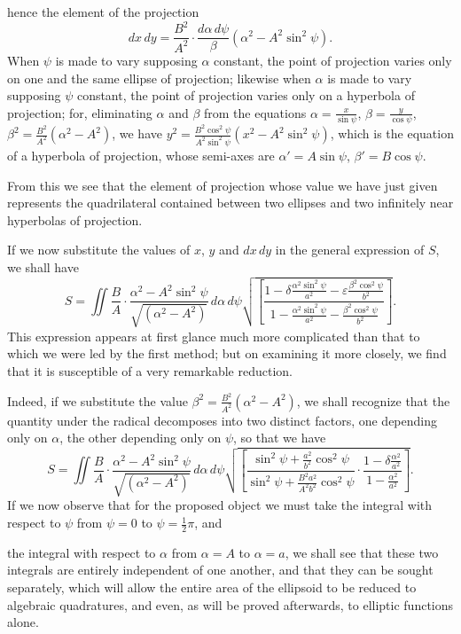 \documentclass{article}
\begin{document}
hence the element of the projection
\[ dx\,dy=\frac{B^{2}}{A^{2}}\cdot\frac{d\alpha\,d\psi}{\beta}(\alpha^{2}-A^{2}\sin^{2}\psi). \]
When $\psi$ is made to vary supposing $\alpha$ constant, the point of projection varies only on one and the same ellipse of projection; likewise when $\alpha$ is made to vary supposing $\psi$ constant, the point of projection varies only on a hyperbola of projection; for, eliminating $\alpha$ and $\beta$ from the equations $\alpha=\frac{x}{\sin\psi}$, $\beta=\frac{y}{\cos\psi}$, $\beta^{2}=\frac{B^{2}}{A^{2}}(\alpha^{2}-A^{2})$, we have $y^{2}=\frac{B^{2}\cos^{2}\psi}{A^{2}\sin^{2}\psi}(x^{2}-A^{2}\sin^{2}\psi)$, which is the equation of a hyperbola of projection, whose semi-axes are $\alpha'=A\sin\psi$, $\beta'=B\cos\psi$.

From this we see that the element of projection whose value we have just given represents the quadrilateral contained between two ellipses and two infinitely near hyperbolas of projection.

If we now substitute the values of $x$, $y$ and $dx\,dy$ in the general expression of $S$, we shall have
\[ S=\iint\frac{B}{A}\cdot\frac{\alpha^{2}-A^{2}\sin^{2}\psi}{\sqrt{(\alpha^{2}-A^{2})}}\,d\alpha\,d\psi\sqrt{\left[\frac{1-\delta\frac{\alpha^{2}\sin^{2}\psi}{a^{2}}-\varepsilon\frac{\beta^{2}\cos^{2}\psi}{b^{2}}}{1-\frac{\alpha^{2}\sin^{2}\psi}{a^{2}}-\frac{\beta^{2}\cos^{2}\psi}{b^{2}}}\right]}. \]
This expression appears at first glance much more complicated than that to which we were led by the first method; but on examining it more closely, we find that it is susceptible of a very remarkable reduction.

Indeed, if we substitute the value $\beta^{2}=\frac{B^{2}}{A^{2}}(\alpha^{2}-A^{2})$, we shall recognize that the quantity under the radical decomposes into two distinct factors, one depending only on $\alpha$, the other depending only on $\psi$, so that we have
\[ S=\iint\frac{B}{A}\cdot\frac{\alpha^{2}-A^{2}\sin^{2}\psi}{\sqrt{(\alpha^{2}-A^{2})}}\,d\alpha\,d\psi\sqrt{\left[\frac{\sin^{2}\psi+\frac{a^{2}}{b^{2}}\cos^{2}\psi}{\sin^{2}\psi+\frac{B^{2}a^{2}}{A^{2}b^{2}}\cos^{2}\psi}\cdot\frac{1-\delta\frac{\alpha^{2}}{a^{2}}}{1-\frac{\alpha^{2}}{a^{2}}}\right]}. \]
If we now observe that for the proposed object we must take the integral with respect to $\psi$ from $\psi=0$ to $\psi=\frac{1}{2}\pi$, and

the integral with respect to $\alpha$ from $\alpha=A$ to $\alpha=a$, we shall see that these two integrals are entirely independent of one another, and that they can be sought separately, which will allow the entire area of the ellipsoid to be reduced to algebraic quadratures, and even, as will be proved afterwards, to elliptic functions alone.
\end{document}
